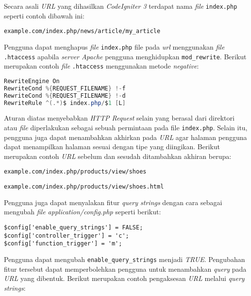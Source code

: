 Secara asali \textit{URL} yang dihasilkan \textit{CodeIgniter 3} terdapat nama \textit{file} \verb|index.php| seperti contoh dibawah ini:

\begin{center}
\verb|example.com/index.php/news/article/my_article|
\end{center}

Pengguna dapat menghapus \textit{file} \verb|index.php| file pada \textit{url} menggunakan \textit{file} \verb|.htaccess| apabila \textit{server Apache} pengguna menghidupkan \verb|mod_rewrite|. Berikut merupakan contoh \textit{file} \verb|.htaccess| menggunakan metode \textit{negative}:

\begin{lstlisting}[language=Java, caption=Contoh \textit{file} \texttt{.htaccess} pada halaman index.php, label=kode:htaccess]
RewriteEngine On
RewriteCond %{REQUEST_FILENAME} !-f
RewriteCond %{REQUEST_FILENAME} !-d
RewriteRule ^(.*)$ index.php/$1 [L]
\end{lstlisting}

Aturan diatas menyebabkan \textit{HTTP Request} selain yang berasal dari direktori atau \textit{file} diperlakukan sebagai sebuah permintaan pada file \verb|index.php|. Selain itu, pengguna juga dapat menambahkan akhirkan pada \textit{URL} agar halaman pengguna dapat menampilkan halaman sesuai dengan tipe yang diingikan. Berikut merupakan contoh \textit{URL} sebelum dan sesudah ditambahkan akhiran berupa: 

\begin{center}
\verb|example.com/index.php/products/view/shoes|

\verb|example.com/index.php/products/view/shoes.html|
\end{center}

Pengguna juga dapat menyalakan fitur \textit{query strings} dengan cara sebagai mengubah \textit{file application/config.php} seperti berikut:

\begin{lstlisting}[caption=\textit{File application/config.php}, label=kode:querystring]
$config['enable_query_strings'] = FALSE;
$config['controller_trigger'] = 'c';
$config['function_trigger'] = 'm';
\end{lstlisting}

Pengguna dapat mengubah \verb|enable_query_strings| menjadi \textit{TRUE}. Pengubahan fitur tersebut dapat memperbolehkan pengguna untuk menambahkan \textit{query} pada \textit{URL} yang dibentuk. Berikut merupakan contoh pengaksesan \textit{URL} melalui \textit{query strings}:


